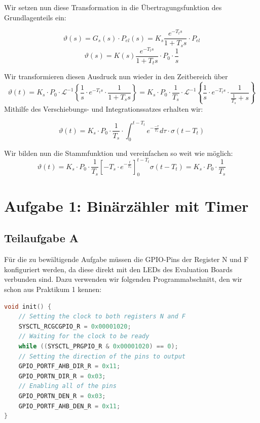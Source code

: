 \documentclass{report}
\begin{document}
Wir setzen nun diese Transformation in die Übertragungsfunktion des Grundlagenteils ein:

\begin{equation}
  \label{eq:4}
  \vartheta(s) = G_{s}(s)\cdot P_{el}(s) = K_{s}\frac{e^{-T_{t}s}}{1+T_{s}s}\cdot P_{el}
\end{equation}
\begin{equation}
  \label{eq:5}
  \vartheta(s) = K(s)\frac{e^{-T_{t}s}}{1+T_{t}s}\cdot P_{0} \cdot \frac{1}{s}
\end{equation}

Wir transformieren diesen Ausdruck nun wieder in den Zeitbereich über
\begin{equation}
  \label{eq:6}
  \vartheta(t) = K_{s} \cdot P_{0}\cdot \mathcal{L}^{-1}\left\{\frac{1}{s}\cdot e^{-T_{t}s}\cdot\frac{1}{1+T_{s}s}\right\} = K_{s} \cdot P_{0} \cdot \frac{1}{T_{s}} \cdot \mathcal{L}^{-1}\left\{\frac{1}{s}\cdot e^{-T_{t}s}\cdot \frac{1}{\frac{1}{T_{s}}+s}\right\}
\end{equation}
Mithilfe des Verschiebungs- und Integrationssatzes erhalten wir:

\begin{equation}
  \label{eq:7}
  \vartheta(t) = K_{s}\cdot P_{0}\cdot \frac{1}{T_{s}}\cdot \int_{0}^{t-T_{t}}e^{-\frac{-\tau}{T_{s}}}d\tau \cdot \sigma(t-T_{t})
\end{equation}

Wir bilden nun die Stammfunktion und vereinfachen so weit wie möglich:
\begin{equation}
  \label{eq:8}
  \vartheta(t) = K_{s}\cdot P_{0} \cdot \frac{1}{T_{s}} \left[-T_{s}\cdot e^{-\frac{t}{T_{s}}}\right]_{0}^{t-T_{t}}\sigma(t-T_{t}) = K_{s}\cdot P_{0} \cdot \frac{1}{T_{s} }
\end{equation}


\section{Aufgabe 1: Binärzähler mit Timer}

\subsection{Teilaufgabe A}

Für die zu bewältigende Aufgabe müssen die GPIO-Pins der Register N und F konfiguriert werden, da diese direkt mit den LEDs des Evaluation Boards verbunden sind.
Dazu verwenden wir folgenden Programmabschnitt, den wir schon aus Praktikum 1 kennen:
\begin{lstlisting}[language=c, caption={GPIO-Port Konfiguration}, captionpos=b]
void init() {
    // Setting the clock to both registers N and F
    SYSCTL_RCGCGPIO_R = 0x00001020;
    // Waiting for the clock to be ready
    while ((SYSCTL_PRGPIO_R & 0x00001020) == 0);
    // Setting the direction of the pins to output
    GPIO_PORTF_AHB_DIR_R = 0x11;
    GPIO_PORTN_DIR_R = 0x03;
    // Enabling all of the pins
    GPIO_PORTN_DEN_R = 0x03;
    GPIO_PORTF_AHB_DEN_R = 0x11;
}
\end{lstlisting}
\end{document}
